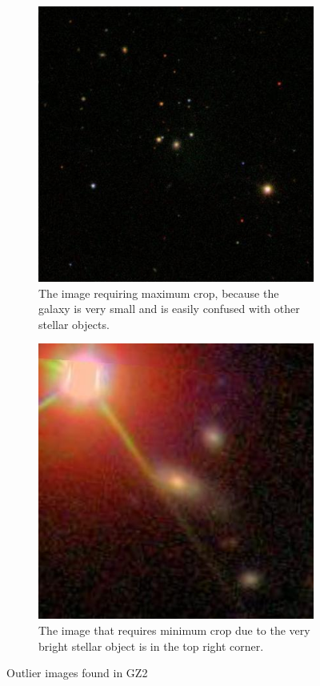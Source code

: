 \documentclass[12pt,a4paper,oneside,oldfontcommands]{memoir}
\begin{document}
\begin{figure}[H]
  \centering
  \begin{subfigure}[b]{0.4\linewidth}
    \includegraphics[width=\linewidth]{images/maximum-256411.jpg}
    \caption{The image requiring maximum crop, because the galaxy is very small and is easily confused with other stellar objects.}
  \end{subfigure}\hspace{1cm}
  \begin{subfigure}[b]{0.4\linewidth}
    \includegraphics[width=\linewidth]{images/minimum-308196.jpg}
    \caption{The image that requires minimum crop due to the very bright stellar object is in the top right corner.}
  \end{subfigure}
  \caption{Outlier images found in GZ2}
  \label{fig:GZ2-2}
\end{figure}
\end{document}
